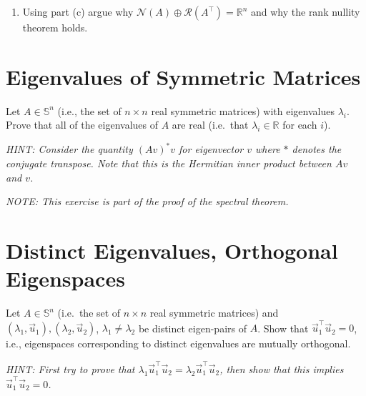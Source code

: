 \documentclass[10pt]{article}
\theoremstyle{definition}
\theoremstyle{plain}
\newcommand{\RR}{\mathbb{R}}
\newcommand{\NN}{\mathcal{N}}
\newcommand{\Range}{\mathcal{R}}
\DeclareMathOperator{\spn}{span}
\newcommand{\vv}[1]{\vec{#1}}
\begin{document}
\begin{enumerate}[label=(\alph*)]
\begin{enumerate}[label=\roman*.]
\textit{Specifically, let $\vv{f}_1, \vv{f}_2, \ldots, \vv{f}_k$ be an orthonormal basis for $\Range\!\left(A^\top\right)$, we can find non-zero $\vv{u}_\perp = \vv{u} - \sum_{i=1}^{k} (\vv{f}_i^\top \vv{u}) \vv{f}_i$ that is orthogonal to $\Range\!\left(A^\top\right)$. Does $\vv{u}_\perp$ lie in $\NN(A)$? Does $\vv{u}_\perp$ also lie in $\spn(\vv{e}_{\ell+1}, \ldots, \vv{e}_n)$? Does this lead to a contradiction? Think of $n - \ell = 3$ and $k = 2$ for visualization.}

\textit{HINT: Second, you can use without proof the fact that for two subspaces, $\mathcal{S}_1$ and $\mathcal{S}_2$, if $\mathcal{S}_1 \subseteq \mathcal{S}_2$ and $\dim(\mathcal{S}_1) = \dim(\mathcal{S}_2)$ then $\mathcal{S}_1 = \mathcal{S}_2$.}
\end{enumerate}

\item Using part (c) argue why $\NN(A) \oplus \Range\!\left(A^\top\right) = \RR^n$ and why the rank nullity theorem holds.
\end{enumerate}

\section{Eigenvalues of Symmetric Matrices}

Let $A \in \mathbb{S}^n$ (i.e., the set of $n \times n$ real symmetric matrices) with eigenvalues $\lambda_i$. Prove that all of the eigenvalues of $A$ are real (i.e.\ that $\lambda_i \in \RR$ for each $i$).

\textit{HINT: Consider the quantity $(Av)^*v$ for eigenvector $v$ where $*$ denotes the conjugate transpose. Note that this is the Hermitian inner product between $Av$ and $v$.}

\textit{NOTE: This exercise is part of the proof of the spectral theorem.}

\section{Distinct Eigenvalues, Orthogonal Eigenspaces}

Let $A \in \mathbb{S}^n$ (i.e.\ the set of $n \times n$ real symmetric matrices) and $(\lambda_1, \vv{u}_1), (\lambda_2, \vv{u}_2)$, $\lambda_1 \neq \lambda_2$ be distinct eigen-pairs of $A$. Show that $\vv{u}_1^\top \vv{u}_2 = 0$, i.e., eigenspaces corresponding to distinct eigenvalues are mutually orthogonal.

\textit{HINT: First try to prove that $\lambda_1 \vv{u}_1^\top \vv{u}_2 = \lambda_2 \vv{u}_1^\top \vv{u}_2$, then show that this implies $\vv{u}_1^\top \vv{u}_2 = 0$.}
\end{document}
